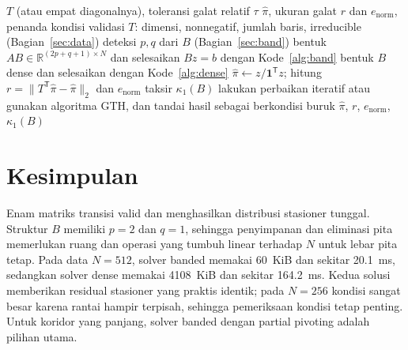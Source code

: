 \documentclass[12pt,a4paper]{article}
\newcommand{\R}{\mathbb{R}}
\newcommand{\T}{\mathsf{T}}
\numberwithin{equation}{section}
\begin{document}
\begin{algorithm}[H]
\caption{Alur yang disarankan untuk menghitung distribusi steady state}
\label{alg:rekomendasi}
\begin{algorithmic}[1]
\Require $T$ (atau empat diagonalnya), toleransi galat relatif $\tau$
\Ensure $\hat\pi$, ukuran galat $r$ dan $e_{\mathrm{norm}}$, penanda kondisi
\State validasi $T$: dimensi, nonnegatif, jumlah baris, irreducible (Bagian~\ref{sec:data})
\State deteksi $p,q$ dari $B$ (Bagian~\ref{sec:band})
  \State bentuk $AB\in\R^{(2p+q+1)\times N}$ dan selesaikan $Bz=b$ dengan Kode~\ref{alg:band}
\Else
  \State bentuk $B$ dense dan selesaikan dengan Kode~\ref{alg:dense}
\EndIf
\State $\hat\pi\gets z/\mathbf1^\T z$; hitung $r=\lVert T^\T\hat\pi-\hat\pi\rVert_2$ dan $e_{\mathrm{norm}}$
\State taksir $\kappa_1(B)$ 
  \State lakukan perbaikan iteratif atau gunakan algoritma GTH, dan tandai hasil sebagai berkondisi buruk
\EndIf
\State \Return $\hat\pi$, $r$, $e_{\mathrm{norm}}$, $\kappa_1(B)$
\end{algorithmic}
\end{algorithm}


\section{Kesimpulan}
Enam matriks transisi valid dan menghasilkan distribusi stasioner tunggal. Struktur $B$ memiliki $p=2$ dan $q=1$, sehingga penyimpanan dan eliminasi pita memerlukan ruang dan operasi yang tumbuh linear terhadap $N$ untuk lebar pita tetap. Pada data $N=512$, solver banded memakai 60~KiB dan sekitar 20.1~ms, sedangkan solver dense memakai 4108~KiB dan sekitar 164.2~ms. Kedua solusi memberikan residual stasioner yang praktis identik; pada $N=256$ kondisi sangat besar karena rantai hampir terpisah, sehingga pemeriksaan kondisi tetap penting. Untuk koridor yang panjang, solver banded dengan partial pivoting adalah pilihan utama.\par
\end{document}
